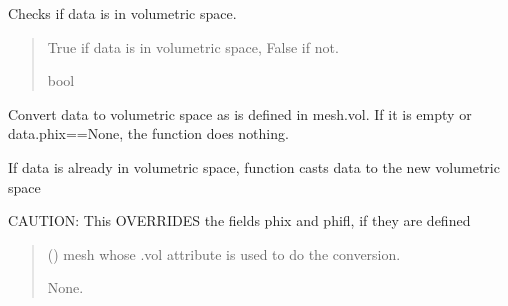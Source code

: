 \documentclass[letterpaper,10pt,english]{sphinxmanual}
\begin{document}
\begin{fulllineitems}
\begin{fulllineitems}
\label{\detokenize{_autosummary/nirfasterff.base.data.flTPSFdata:nirfasterff.base.data.flTPSFdata.isvol}}
\pysigstartsignatures
\pysiglinewithargsret
{}
{}
{}
\pysigstopsignatures
\sphinxAtStartPar
Checks if data is in volumetric space.
\begin{quote}\begin{description}
\sphinxAtStartPar
True if data is in volumetric space, False if not.

\sphinxAtStartPar
bool

\end{description}\end{quote}

\end{fulllineitems}


\begin{fulllineitems}
\label{\detokenize{_autosummary/nirfasterff.base.data.flTPSFdata:nirfasterff.base.data.flTPSFdata.togrid}}
\pysigstartsignatures
\pysiglinewithargsret
{}
{}
{}
\pysigstopsignatures
\sphinxAtStartPar
Convert data to volumetric space as is defined in mesh.vol. If it is empty or data.phix==None, the function does nothing.

\sphinxAtStartPar
If data is already in volumetric space, function casts data to the new volumetric space

\sphinxAtStartPar
CAUTION: This OVERRIDES the fields phix and phifl, if they are defined
\begin{quote}\begin{description}
\sphinxAtStartPar
{} () \textendash{} mesh whose .vol attribute is used to do the conversion.

\sphinxAtStartPar
None.

\end{description}\end{quote}

\end{fulllineitems}



\end{fulllineitems}
\end{document}
